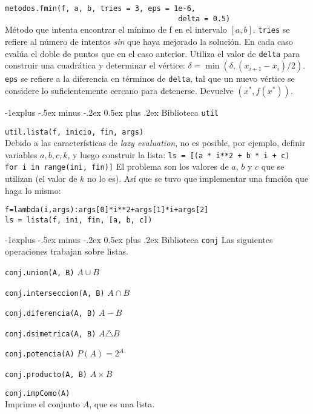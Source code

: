\documentclass[10pt,landscape]{article}
\makeatletter
\renewcommand{\subsection}{\@startsection{subsection}{2}{0mm}%
                                {-1explus -.5ex minus -.2ex}%
                                {0.5ex plus .2ex}%
                                {\normalfont\normalsize\bfseries}}
\makeatother
\begin{document}
\begin{multicols}{3}
\begin{asparaitem}
\item \verb|metodos.fmin(f, a, b, tries = 3, eps = 1e-6,|\\
  \verb|                                        delta = 0.5)| \\
  \quad M\'etodo que intenta encontrar el m\'inimo de f en el intervalo $[a, b]$. \verb|tries| se refiere al n\'umero de intentos \emph{sin} que haya mejorado la soluci\'on. En cada caso eval\'ua el doble de puntos que en el caso anterior. Utiliza el valor de \verb|delta| para construir una cuadr\'atica y determinar el v\'ertice: $\delta = \min(\delta, (x_{i+1}-x_i)/2)$. \verb|eps| se refiere a la diferencia en t\'erminos de \verb|delta|, tal que un nuevo v\'ertice se considere lo suficientemente cercano para detenerse. Devuelve $(x^*, f(x^*))$.
\end{asparaitem}


\subsection{Biblioteca \texttt{util}}

\begin{asparaitem}
\item \verb|util.lista(f, inicio, fin, args)| \\
  Debido a las caracter\'isticas de \emph{lazy evaluation}, no es posible, por ejemplo, definir variables $a,b,c,k$, y luego construir la lista:
  \verb|ls = [(a * i**2 + b * i + c)  for i in range(ini, fin)]| El problema son los valores de $a$, $b$ y $c$ que se utilizan (el valor de $k$ no lo es). As\'i que se tuvo que implementar una funci\'on que haga lo mismo:
\begin{verbatim}
f=lambda(i,args):args[0]*i**2+args[1]*i+args[2]
ls = lista(f, ini, fin, [a, b, c])
\end{verbatim}
\end{asparaitem}

\subsection{Biblioteca \texttt{conj}}
Las siguientes operaciones trabajan sobre listas.
\begin{asparaitem}
\item \verb|conj.union(A, B)| $A\cup B$
\item \verb|conj.interseccion(A, B)| $A\cap B$
\item \verb|conj.diferencia(A, B)| $A-B$
\item \verb|conj.dsimetrica(A, B)| $A \triangle B$
\item \verb|conj.potencia(A)| $P(A)=2^A$
\item \verb|conj.producto(A, B)| $A\times B$
\item \verb|conj.impComo(A)| \\
  Imprime el conjunto $A$, que es una lista.
\end{asparaitem}


\end{multicols}
\end{document}
